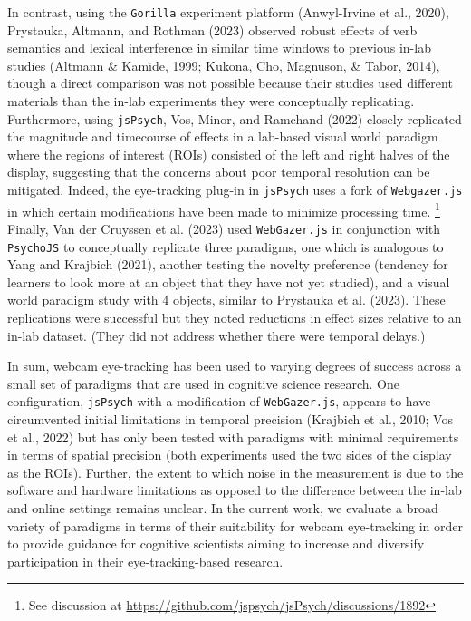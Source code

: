 \documentclass[
  man,floatsintext]{apa6}
\begin{document}
In contrast, using the \texttt{Gorilla} experiment platform (Anwyl-Irvine et al., 2020), Prystauka, Altmann, and Rothman (2023) observed robust effects of verb semantics and lexical interference in similar time windows to previous in-lab studies (Altmann \& Kamide, 1999; Kukona, Cho, Magnuson, \& Tabor, 2014), though a direct comparison was not possible because their studies used different materials than the in-lab experiments they were conceptually replicating. Furthermore, using \texttt{jsPsych}, Vos, Minor, and Ramchand (2022) closely replicated the magnitude and timecourse of effects in a lab-based visual world paradigm where the regions of interest (ROIs) consisted of the left and right halves of the display, suggesting that the concerns about poor temporal resolution can be mitigated. Indeed, the eye-tracking plug-in in \texttt{jsPsych} uses a fork of \texttt{Webgazer.js} in which certain modifications have been made to minimize processing time. \footnote{See discussion at \url{https://github.com/jspsych/jsPsych/discussions/1892}}
Finally, Van der Cruyssen et al. (2023) used \texttt{WebGazer.js} in conjunction with \texttt{PsychoJS} to conceptually replicate three paradigms, one which is analogous to Yang and Krajbich (2021), another testing the novelty preference (tendency for learners to look more at an object that they have not yet studied), and a visual world paradigm study with 4 objects, similar to Prystauka et al. (2023). These replications were successful but they noted reductions in effect sizes relative to an in-lab dataset. (They did not address whether there were temporal delays.)

In sum, webcam eye-tracking has been used to varying degrees of success across a small set of paradigms that are used in cognitive science research. One configuration, \texttt{jsPsych} with a modification of \texttt{WebGazer.js}, appears to have circumvented initial limitations in temporal precision (Krajbich et al., 2010; Vos et al., 2022) but has only been tested with paradigms with minimal requirements in terms of spatial precision (both experiments used the two sides of the display as the ROIs). Further, the extent to which noise in the measurement is due to the software and hardware limitations as opposed to the difference between the in-lab and online settings remains unclear. In the current work, we evaluate a broad variety of paradigms in terms of their suitability for webcam eye-tracking in order to provide guidance for cognitive scientists aiming to increase and diversify participation in their eye-tracking-based research.
\end{document}
